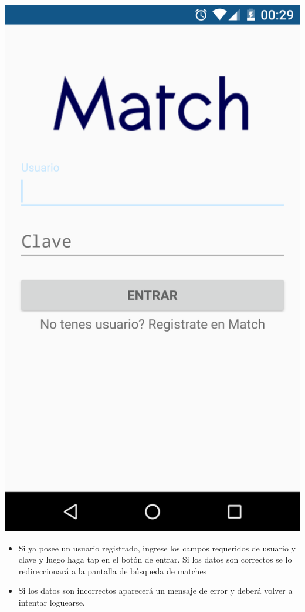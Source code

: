 \documentclass[letterpaper,10pt,english]{sphinxmanual}
\begin{document}
\includegraphics{login.png}
\begin{itemize}
\item {} 
Si ya posee un usuario registrado, ingrese los campos requeridos de usuario y clave y luego haga tap en el botón de entrar. Si los datos son correctos se lo redireccionará a la pantalla de búsqueda de matches

\item {} 
Si los datos son incorrectos aparecerá un mensaje de error y deberá volver a intentar loguearse.

\end{itemize}
\end{document}
